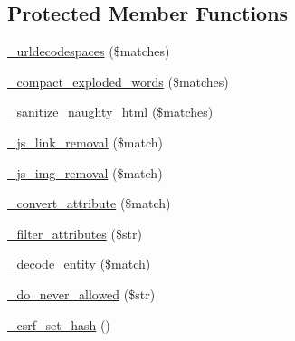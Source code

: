 \subsection*{Protected Member Functions}
\begin{DoxyCompactItemize}
\item 
\mbox{\hyperlink{class_c_i___security_a560c9099c1f93c954eac4f4c6185b768}{\+\_\+urldecodespaces}} (\$matches)
\item 
\mbox{\hyperlink{class_c_i___security_ad2dfad96dd004a60c77771c1f0ad4194}{\+\_\+compact\+\_\+exploded\+\_\+words}} (\$matches)
\item 
\mbox{\hyperlink{class_c_i___security_aebc54709b88db288c4bf6f4903511c22}{\+\_\+sanitize\+\_\+naughty\+\_\+html}} (\$matches)
\item 
\mbox{\hyperlink{class_c_i___security_a3e09d1f7fdc47de100df6e40fdb44b72}{\+\_\+js\+\_\+link\+\_\+removal}} (\$match)
\item 
\mbox{\hyperlink{class_c_i___security_ad2795f9f809d310f0a0d2f5cad87a81d}{\+\_\+js\+\_\+img\+\_\+removal}} (\$match)
\item 
\mbox{\hyperlink{class_c_i___security_abe0a6444266cd826927ed138d55a088a}{\+\_\+convert\+\_\+attribute}} (\$match)
\item 
\mbox{\hyperlink{class_c_i___security_a5f41eab080092e9fcaabcb270cba98f3}{\+\_\+filter\+\_\+attributes}} (\$str)
\item 
\mbox{\hyperlink{class_c_i___security_a9e9024c0f3ed639e5095f2aa33698db5}{\+\_\+decode\+\_\+entity}} (\$match)
\item 
\mbox{\hyperlink{class_c_i___security_ad3471f31a4afa1d88b5a58705e951b88}{\+\_\+do\+\_\+never\+\_\+allowed}} (\$str)
\item 
\mbox{\hyperlink{class_c_i___security_a77327709ac2d3f176431a391bf27e2af}{\+\_\+csrf\+\_\+set\+\_\+hash}} ()
\end{DoxyCompactItemize}
